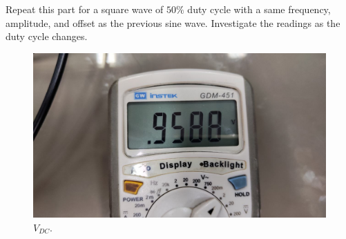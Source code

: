 \documentclass[11pt]{article}
\newcommand{\PicScale}{0.2}
\begin{document}
\begin{question}
\begin{subquestion}{Repeat this part for a square wave of $50\%$ duty cycle with a same frequency, amplitude, and offset as the previous sine wave. Investigate the readings as the duty cycle changes.}
{            \begin{figure}[H]
                \begin{center}
                    \includegraphics[scale=\PicScale]{Fig/32.jpeg}
                    \caption{$V_{DC}$.}
                \end{center}
            \end{figure}

}
\end{subquestion}
\end{question}
\end{document}
